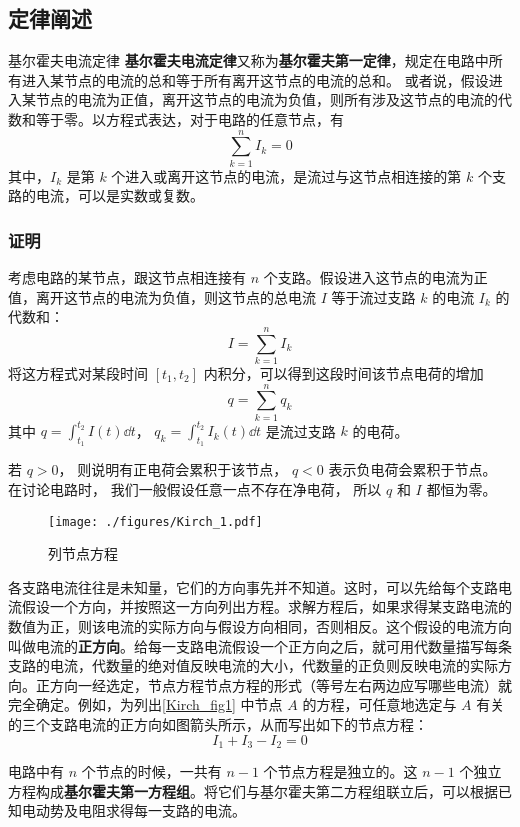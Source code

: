 

\subsection{定律阐述}
\begin{theorem}{基尔霍夫电流定律}
\textbf{基尔霍夫电流定律}又称为\textbf{基尔霍夫第一定律}，规定在电路中所有进入某节点的电流的总和等于所有离开这节点的电流的总和。 或者说，假设进入某节点的电流为正值，离开这节点的电流为负值，则所有涉及这节点的电流的代数和等于零。以方程式表达，对于电路的任意节点，有
\begin{equation}
\sum_{k=1}^n I_k =0
\end{equation}
其中，$I_k$ 是第 $k$ 个进入或离开这节点的电流，是流过与这节点相连接的第 $k$ 个支路的电流，可以是实数或复数。
\end{theorem}

\subsubsection{证明}
考虑电路的某节点，跟这节点相连接有 $n$ 个支路。假设进入这节点的电流为正值，离开这节点的电流为负值，则这节点的总电流 $I$ 等于流过支路 $k$ 的电流 $I_k$ 的代数和：
\begin{equation}
I=\sum_{k=1}^n I_k
\end{equation}
将这方程式对某段时间 $[t_1, t_2]$ 内积分，可以得到这段时间该节点电荷的增加
\begin{equation}
q=\sum_{k=1}^n q_k
\end{equation}
其中 $q = \int_{t_1}^{t_2} I(t) \dd{t}$， $q_k=\int_{t_1}^{t_2} I_k(t) \dd{t}$ 是流过支路 $k$ 的电荷。

若 $q>0$， 则说明有正电荷会累积于该节点， $q < 0$ 表示负电荷会累积于节点。 在讨论电路时， 我们一般假设任意一点不存在净电荷， 所以 $q$ 和 $I$ 都恒为零。

\begin{example}{}

\begin{figure}[ht]
\centering
\texttt{[image: ./figures/Kirch\_1.pdf]}
\caption{列节点方程} \label{Kirch_fig1}
\end{figure}
各支路电流往往是未知量，它们的方向事先并不知道。这时，可以先给每个支路电流假设一个方向，并按照这一方向列出方程。求解方程后，如果求得某支路电流的数值为正，则该电流的实际方向与假设方向相同，否则相反。这个假设的电流方向叫做电流的\textbf{正方向}。给每一支路电流假设一个正方向之后，就可用代数量描写每条支路的电流，代数量的绝对值反映电流的大小，代数量的正负则反映电流的实际方向。正方向一经选定，节点方程节点方程的形式（等号左右两边应写哪些电流）就完全确定。例如，为列出\autoref{Kirch_fig1} 中节点 $A$ 的方程，可任意地选定与 $A $ 有关的三个支路电流的正方向如图箭头所示，从而写出如下的节点方程：
\begin{equation}
I_1+I_3-I_2=0
\end{equation}
\end{example}
电路中有 $n$ 个节点的时候，一共有 $n-1$ 个节点方程是独立的。这 $n-1$ 个独立方程构成\textbf{基尔霍夫第一方程组}。将它们与基尔霍夫第二方程组联立后，可以根据已知电动势及电阻求得每一支路的电流。

